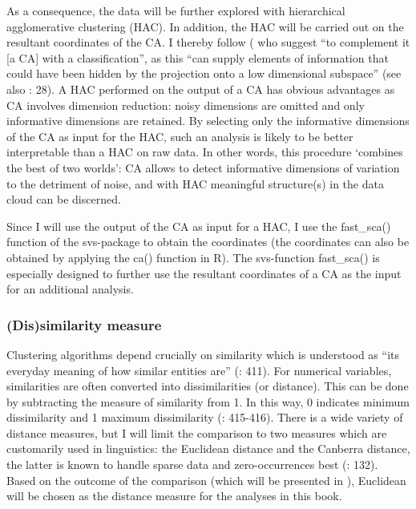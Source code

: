 As a consequence, the data will be further explored with hierarchical agglomerative clustering (HAC). In addition, the HAC will be carried out on the resultant coordinates of the CA. I thereby follow (\citet[335]{cuadras_correspondence_1993} who suggest “to complement it [a CA] with a classification”, as this “can supply elements of information that could have been hidden by the projection onto a low dimensional subspace” (see also \citealt{ciampi_correspondence_2005}: 28). A HAC performed on the output of a CA has obvious advantages as CA involves dimension reduction: noisy dimensions are omitted and only informative dimensions are retained. By selecting only the informative dimensions of the CA as input for the HAC, such an analysis is likely to be better interpretable than a HAC on raw data. In other words, this procedure ‘combines the best of two worlds’: CA allows to detect informative dimensions of variation to the detriment of noise, and with HAC meaningful structure(s) in the data cloud can be discerned.



Since I will use the output of the CA as input for a HAC, I use the fast\_sca() function of the svs{}-package to obtain the coordinates (the coordinates can also be obtained by applying the ca() function in R). The svs{}-function fast\_sca() is especially designed to further use the resultant coordinates of a CA as the input for an additional analysis.


\subsubsection{\label{sec:3.7.2.1}  (Dis)similarity measure}

Clustering algorithms depend crucially on similarity which is understood as “its everyday meaning of how similar entities are” (\citealt{glynn_cluster_2014}: 411). For numerical variables, similarities are often converted into dissimilarities (or distance). This can be done by subtracting the measure of similarity from 1. In this way, 0 indicates minimum dissimilarity and 1 maximum dissimilarity (\citealt{glynn_cluster_2014}: 415-416). There is a wide variety of distance measures, but I will limit the comparison to two measures which are customarily used in linguistics: the Euclidean distance and the Canberra distance, the latter is known to handle sparse data and zero-occurrences best (\citealt{divjak_structuring_2010}: 132). Based on the outcome of the comparison (which will be presented in ), Euclidean will be chosen as the distance measure for the analyses in this book.


